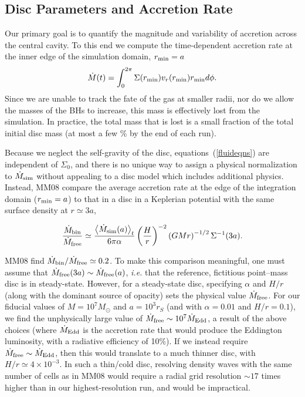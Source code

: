 \subsection{Disc Parameters and Accretion Rate}
\label{disc Parameters and Accretion Rate}

Our primary goal is to quantify the magnitude and variability of
accretion across the central cavity.  To this end we compute the
time-dependent accretion rate at the inner edge of the simulation
domain, $r_{\rm{min}} = a$
%
\begin{equation}
\dot{M}(t) = \int^{2\pi}_{0}{ \Sigma(r_{\rm{min}}) v_r(r_{\rm{min}})
r_{\rm{min}} d\phi }.
\end{equation}
%
Since we are unable to track the fate of the gas at smaller radii, nor
do we allow the masses of the BHs to increase, this mass is
effectively lost from the simulation. In practice, the total mass that
is lost is a small fraction of the total initial disc mass (at most a
few \% by the end of each run).

Because we neglect the self-gravity of the disc,
equations~(\ref{fluideqns}) are independent of $\Sigma_0$, and there
is no unique way to assign a physical normalization to
$\dot{M}_{\rm{sim}}$ without appealing to a disc model which includes
additional physics.  Instead, MM08 compare the average accretion rate
at the edge of the integration domain ($r_{\rm{min}}=a$) to that in a
disc in a Keplerian potential with the same surface density at
$r\simeq3a$,

\begin{equation}
\frac{\dot{M}_{\rm{bin}} }{\dot{M}_{\rm{free}} } \simeq \frac{
\left<\dot{M}_{\rm{sim}}(a) \right>_t }{6 \pi \alpha}
\left(\frac{H}{r}\right)^{-2} \left( GMr\right)^{-1/2}
\Sigma^{-1}(3a).
\label{Mbin_Mfree}
\end{equation} 

MM08 find ${\dot{M}_{\rm{bin}} }/{\dot{M}_{\rm{free}} } \simeq
0.2$. To make this comparison meaningful, one must assume that
$\dot{M}_{\rm{free}}(3a) \sim \dot{M}_{\rm{free}}(a)$, \textit{i.e.}
that the reference, fictitious point--mass disc is in steady-state.
However, for a steady-state disc, specifying $\alpha$ and $H/r$ (along
with the dominant source of opacity) sets the physical value
$\dot{M}_{\rm{free}}$. For our fiducial values of $M = 10^7M_{\odot}$
and $a=10^3 r_S$ (and with $\alpha=0.01$ and $H/r=0.1$), we find the
unphysically large value of $\dot{M}_{\rm{free}} \sim 10^7
\dot{M}_{\rm{Edd}}$, a result of the above choices (where $\dot{M}_{\rm{Edd}}$ is the accretion rate
that would produce the Eddington luminosity, with a radiative
efficiency of 10\%).  If we instead require $\dot{M}_{\rm{free}} \sim
\dot{M}_{\rm{Edd}}$, then this would translate to a much thinner disc,
with $H/r \simeq 4 \times 10^{-3}$.  In such a thin/cold disc,
resolving density waves with the same number of cells as in MM08 would
require a radial grid resolution $\sim 17$ times higher than in our
highest-resolution run, and would be impractical.

